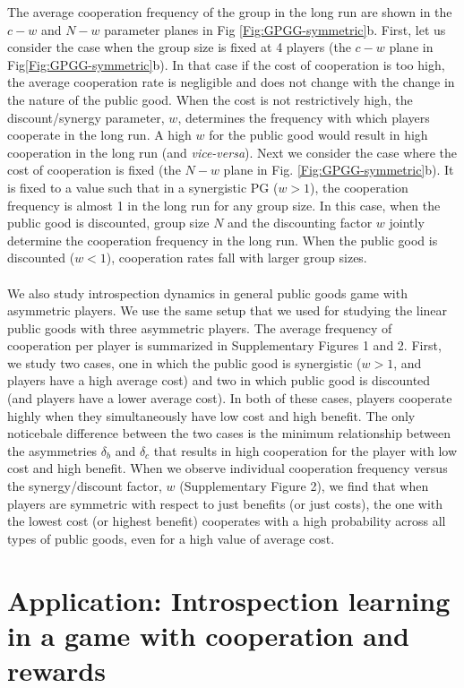 \documentclass[11pt]{article}
\theoremstyle{plainCl1}
\theoremstyle{plainCl2}
\begin{document}
\noindent The average cooperation frequency of the group in the long run are shown in the $c-w$ and $N-w$ parameter planes in Fig \ref{Fig:GPGG-symmetric}b. First, let us consider the case when the group size is fixed at 4 players (the $c-w$ plane in Fig\ref{Fig:GPGG-symmetric}b). In that case if the cost of cooperation is too high, the average cooperation rate is negligible and does not change with the change in the nature of the public good. When the cost is not restrictively high, the discount/synergy parameter, $w$, determines the frequency with which players cooperate in the long run. A high $w$ for the public good would result in high cooperation in the long run (and \emph{vice-versa}). Next we consider the case where the cost of cooperation is fixed (the $N-w$ plane in Fig. \ref{Fig:GPGG-symmetric}b). It is fixed to a value such that in a synergistic PG ($w > 1$), the cooperation frequency is almost 1 in the long run for any group size. In this case, when the public good is discounted, group size $N$ and the discounting factor $w$ jointly determine the cooperation frequency in the long run. When the public good is discounted ($w < 1$), cooperation rates fall with larger group sizes.\\ \\
\noindent 
We also study introspection dynamics in general public goods game with asymmetric players. We use the same setup that we used for studying the linear public goods with three asymmetric players. The average frequency of cooperation per player is summarized in Supplementary Figures 1 and 2. First, we study two cases, one in which the public good is synergistic ($w > 1$, and players have a high average cost) and two in which public good is discounted (and players have a lower average cost). In both of these cases, players cooperate highly when they simultaneously have low cost and high benefit. The only noticebale difference between the two cases is the minimum relationship between the asymmetries $\delta_b$ and $\delta_c$ that results in high cooperation for the player with low cost and high benefit. When we observe individual cooperation frequency versus the synergy/discount factor, $w$ (Supplementary Figure 2), we find that when players are symmetric with respect to just benefits (or just costs), the one with the lowest cost (or highest benefit) cooperates with a high probability across all types of public goods, even for a high value of average cost.

\section*{Application: Introspection learning in a game with cooperation and rewards}
\end{document}
